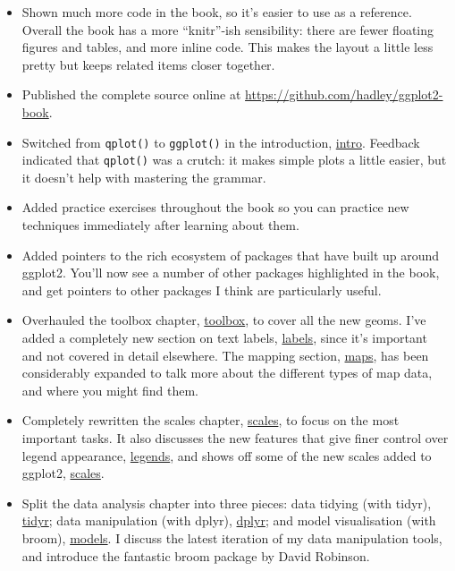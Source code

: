 \begin{itemize}
\item
  Shown much more code in the book, so it's easier to use as a
  reference. Overall the book has a more ``knitr''-ish sensibility:
  there are fewer floating figures and tables, and more inline code.
  This makes the layout a little less pretty but keeps related items
  closer together.
\item
  Published the complete source online at
  \url{https://github.com/hadley/ggplot2-book}.
\item
  Switched from \texttt{qplot()} to \texttt{ggplot()} in the
  introduction, \protect\hyperlink{cha:getting-started}{intro}. Feedback
  indicated that \texttt{qplot()} was a crutch: it makes simple plots a
  little easier, but it doesn't help with mastering the grammar.
\item
  Added practice exercises throughout the book so you can practice new
  techniques immediately after learning about them.
\item
  Added pointers to the rich ecosystem of packages that have built up
  around ggplot2. You'll now see a number of other packages highlighted
  in the book, and get pointers to other packages I think are
  particularly useful.
\item
  Overhauled the toolbox chapter,
  \protect\hyperlink{cha:toolbox}{toolbox}, to cover all the new geoms.
  I've added a completely new section on text labels,
  \protect\hyperlink{sec:labelling}{labels}, since it's important and
  not covered in detail elsewhere. The mapping section,
  \protect\hyperlink{sec:maps}{maps}, has been considerably expanded to
  talk more about the different types of map data, and where you might
  find them.
\item
  Completely rewritten the scales chapter,
  \protect\hyperlink{cha:scales}{scales}, to focus on the most important
  tasks. It also discusses the new features that give finer control over
  legend appearance, \protect\hyperlink{sec:legends}{legends}, and shows
  off some of the new scales added to ggplot2,
  \protect\hyperlink{sec:scale-details}{scales}.
\item
  Split the data analysis chapter into three pieces: data tidying (with
  tidyr), \protect\hyperlink{cha:data}{tidyr}; data manipulation (with
  dplyr), \protect\hyperlink{cha:dplyr}{dplyr}; and model visualisation
  (with broom), \protect\hyperlink{cha:modelling}{models}. I discuss the
  latest iteration of my data manipulation tools, and introduce the
  fantastic broom package by David Robinson.
\end{itemize}

